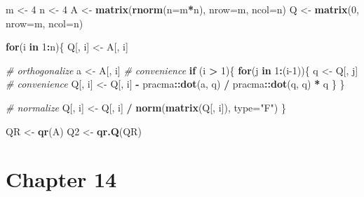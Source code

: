 \documentclass[
]{book}
\newenvironment{Shaded}{\begin{snugshade}}{\end{snugshade}}
\newcommand{\CommentTok}[1]{\textcolor[rgb]{0.56,0.35,0.01}{\textit{#1}}}
\newcommand{\ControlFlowTok}[1]{\textcolor[rgb]{0.13,0.29,0.53}{\textbf{#1}}}
\newcommand{\DataTypeTok}[1]{\textcolor[rgb]{0.13,0.29,0.53}{#1}}
\newcommand{\DecValTok}[1]{\textcolor[rgb]{0.00,0.00,0.81}{#1}}
\newcommand{\KeywordTok}[1]{\textcolor[rgb]{0.13,0.29,0.53}{\textbf{#1}}}
\newcommand{\NormalTok}[1]{#1}
\newcommand{\OperatorTok}[1]{\textcolor[rgb]{0.81,0.36,0.00}{\textbf{#1}}}
\newcommand{\StringTok}[1]{\textcolor[rgb]{0.31,0.60,0.02}{#1}}
\begin{document}
\begin{Shaded}
\begin{Highlighting}[]
\NormalTok{m \textless{}{-}}\StringTok{ }\DecValTok{4}
\NormalTok{n \textless{}{-}}\StringTok{ }\DecValTok{4}
\NormalTok{A \textless{}{-}}\StringTok{ }\KeywordTok{matrix}\NormalTok{(}\KeywordTok{rnorm}\NormalTok{(}\DataTypeTok{n=}\NormalTok{m}\OperatorTok{*}\NormalTok{n), }\DataTypeTok{nrow=}\NormalTok{m, }\DataTypeTok{ncol=}\NormalTok{n)}
\NormalTok{Q \textless{}{-}}\StringTok{ }\KeywordTok{matrix}\NormalTok{(}\DecValTok{0}\NormalTok{, }\DataTypeTok{nrow=}\NormalTok{m, }\DataTypeTok{ncol=}\NormalTok{n)}

\ControlFlowTok{for}\NormalTok{(i }\ControlFlowTok{in} \DecValTok{1}\OperatorTok{:}\NormalTok{n)\{}
\NormalTok{  Q[, i] \textless{}{-}}\StringTok{ }\NormalTok{A[, i]}
  
  \CommentTok{\# orthogonalize}
\NormalTok{  a \textless{}{-}}\StringTok{ }\NormalTok{A[, i] }\CommentTok{\# convenience}
  \ControlFlowTok{if}\NormalTok{ (i }\OperatorTok{\textgreater{}}\StringTok{ }\DecValTok{1}\NormalTok{)\{}
    \ControlFlowTok{for}\NormalTok{(j }\ControlFlowTok{in} \DecValTok{1}\OperatorTok{:}\NormalTok{(i}\DecValTok{{-}1}\NormalTok{))\{}
\NormalTok{      q \textless{}{-}}\StringTok{ }\NormalTok{Q[, j] }\CommentTok{\# convenience}
\NormalTok{      Q[, i] \textless{}{-}}\StringTok{ }\NormalTok{Q[, i] }\OperatorTok{{-}}\StringTok{ }\NormalTok{pracma}\OperatorTok{::}\KeywordTok{dot}\NormalTok{(a, q) }\OperatorTok{/}\StringTok{ }\NormalTok{pracma}\OperatorTok{::}\KeywordTok{dot}\NormalTok{(q, q) }\OperatorTok{*}\StringTok{ }\NormalTok{q }
\NormalTok{    \}}
\NormalTok{  \}}
  
  \CommentTok{\# normalize}
\NormalTok{  Q[, i] \textless{}{-}}\StringTok{ }\NormalTok{Q[, i] }\OperatorTok{/}\StringTok{ }\KeywordTok{norm}\NormalTok{(}\KeywordTok{matrix}\NormalTok{(Q[, i]), }\DataTypeTok{type=}\StringTok{"F"}\NormalTok{)}
\NormalTok{\}}

\NormalTok{QR \textless{}{-}}\StringTok{ }\KeywordTok{qr}\NormalTok{(A)}
\NormalTok{Q2 \textless{}{-}}\StringTok{ }\KeywordTok{qr.Q}\NormalTok{(QR)}
\end{Highlighting}
\end{Shaded}

\hypertarget{chapter-14}{%
\section*{Chapter 14}\label{chapter-14}}
\end{document}
